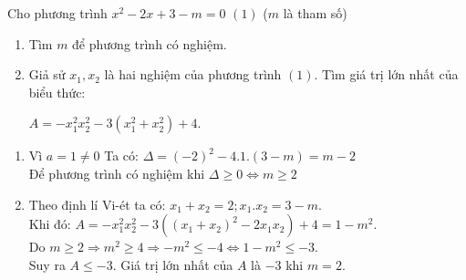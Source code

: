 \begin{ex}%
Cho phương trình  ${x^2} - 2x + 3 - m = 0$ $(1)$ ($m$ là tham số)
    \begin{enumerate}
        \item Tìm $m$ để phương trình có nghiệm.
        \item Giả sử $x_1,x_2$ là hai nghiệm của phương trình $(1)$. Tìm giá trị lớn nhất của biểu thức:
            \begin{center}$A =  - x_1^2x_2^2 - 3\left( {x_1^2 + x_2^2} \right) + 4$.
            \end{center}
    \end{enumerate}
\loigiai
    {
    \begin{enumerate}
        \item  Vì $a=1 \neq 0$ Ta có: $\Delta =(-2)^2-4.1.(3-m)=m-2$\\
        Để phương trình có nghiệm khi $\Delta \geq 0 \Leftrightarrow m \geq 2$
        \item Theo định lí Vi-ét ta có: $x_1+x_2=2;x_1.x_2=3-m$.\\
        Khi đó: $A =  - x_1^2x_2^2 - 3\left( {{{\left( {x_1 + x_2} \right)}^2} - 2{x_1}x_2} \right) + 4 = 1 - m^2$.\\
        Do $m\geq 2 \Rightarrow m^2\geq 4 \Rightarrow -m^2 \leq -4 \Leftrightarrow 1-m^2 \leq -3$.\\
        Suy ra $A \leq -3$. Giá trị lớn nhất của $A$ là $-3$ khi $m=2$.
    \end{enumerate}
    }
\end{ex}

